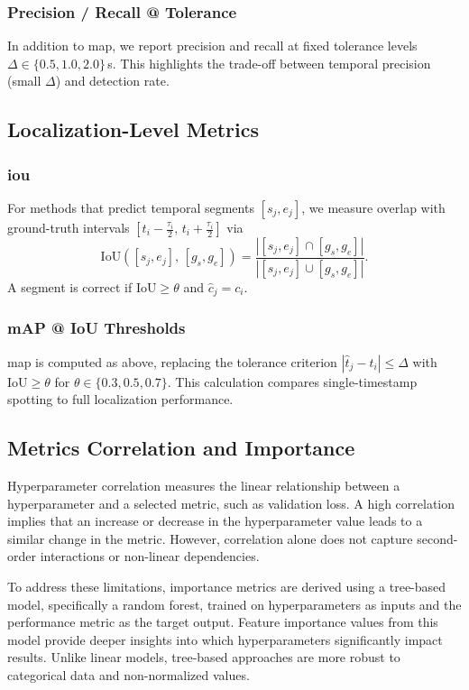 \subsubsection{Precision / Recall @ Tolerance}
In addition to \acrshort{map}, we report precision and recall at fixed tolerance levels $\Delta\in\{0.5,1.0,2.0\}$\,s. This highlights the trade-off between temporal precision (small $\Delta$) and detection rate.

\subsection{Localization-Level Metrics}
\subsubsection{\acrfull{iou}}
For methods that predict temporal segments $[s_j,e_j]$, we measure overlap with ground-truth intervals $[t_i-\tfrac{\tau_i}{2},\,t_i+\tfrac{\tau_i}{2}]$ via
\[
\mathrm{IoU}([s_j,e_j],\,[g_s,g_e]) 
= \frac{|[s_j,e_j]\cap [g_s,g_e]|}{|[s_j,e_j]\cup [g_s,g_e]|}.
\]
A segment is correct if $\mathrm{IoU}\!\ge\theta$ and $\hat c_j=c_i$.

\subsubsection{mAP @ IoU Thresholds}
\acrshort{map} is computed as above, replacing the tolerance criterion $|\hat t_j - t_i|\le\Delta$ with $\mathrm{IoU}\ge\theta$ for $\theta\in\{0.3,0.5,0.7\}$. This calculation compares single-timestamp spotting to full localization performance.


\subsection{Metrics Correlation and Importance}

Hyperparameter correlation measures the linear relationship between a hyperparameter and a selected metric, such as validation loss. A high correlation implies that an increase or decrease in the hyperparameter value leads to a similar change in the metric. However, correlation alone does not capture second-order interactions or non-linear dependencies.

To address these limitations, importance metrics are derived using a tree-based model, specifically a random forest, trained on hyperparameters as inputs and the performance metric as the target output. Feature importance values from this model provide deeper insights into which hyperparameters significantly impact results. Unlike linear models, tree-based approaches are more robust to categorical data and non-normalized values.

